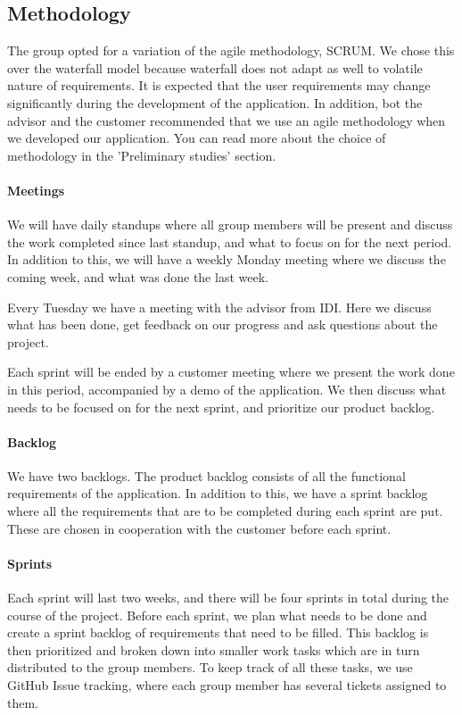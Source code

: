 \subsection{Methodology}

The group opted for a variation of the agile methodology, SCRUM. We chose this
over the waterfall model because waterfall does not adapt as well to volatile
nature of requirements. 
It is expected that the user requirements may change significantly during the
development of the application. In addition, bot the advisor and the customer
recommended that we use an agile methodology when we developed our application.
You can read more about the choice of methodology in the 'Preliminary studies'
section. 

\paragraph{Meetings}
We will have daily standups where all group members will be present and discuss
the work completed since last standup, and what to focus on for the next period.
In addition to this, we will have a weekly Monday meeting where we discuss the
coming week, and what was done the last week. 

Every Tuesday we have a meeting with the advisor from IDI. Here we discuss what
has been done, get feedback on our progress and ask questions about the project.

Each sprint will be ended by a customer meeting where we present the work done
in this period, accompanied by a demo of the application. We then discuss what
needs to be focused on for the next sprint, and prioritize our product
backlog. 

\paragraph{Backlog}
We have two backlogs. The product backlog consists of all the functional
requirements of the application. In addition to this, we have a sprint backlog
where all the requirements that are to be completed during each sprint are put.
These are chosen in cooperation with the customer before each sprint. 

\paragraph{Sprints}
Each sprint will last two weeks, and there will be four sprints in total during
the course of the project. Before each sprint, we plan what needs to be done and
create a sprint backlog of requirements that need to be filled. This backlog is
then prioritized and broken down into smaller work tasks which are in turn
distributed to the group members. To keep track of all these tasks, we use GitHub
Issue tracking, where each group member has several tickets assigned to them.

